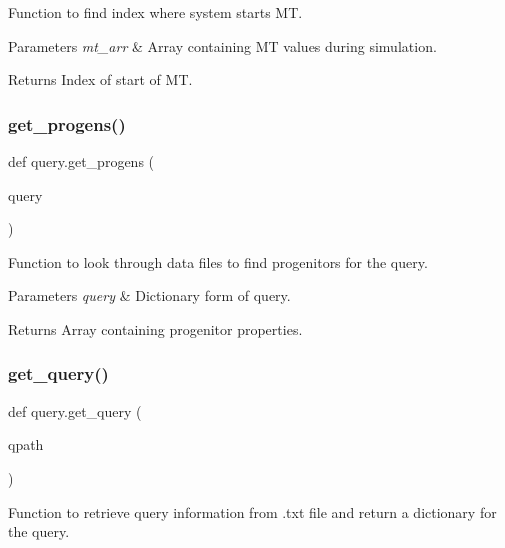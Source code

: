 Function to find index where system starts MT. 


\begin{DoxyParams}{Parameters}
{\em mt\+\_\+arr} & Array containing MT values during simulation. \\
\hline
\end{DoxyParams}
\begin{DoxyReturn}{Returns}
Index of start of MT. 
\end{DoxyReturn}
\mbox{\label{namespacequery_aa6657f1df72e61cb1a20d05df95d7dec}} 
\subsubsection{\texorpdfstring{get\+\_\+progens()}{get\_progens()}}
{\footnotesize\ttfamily def query.\+get\+\_\+progens (\begin{DoxyParamCaption}\item[{}]{query }\end{DoxyParamCaption})}



Function to look through data files to find progenitors for the query. 


\begin{DoxyParams}{Parameters}
{\em query} & Dictionary form of query. \\
\hline
\end{DoxyParams}
\begin{DoxyReturn}{Returns}
Array containing progenitor properties. 
\end{DoxyReturn}
\mbox{\label{namespacequery_a5c2d384360f955a8d047fe01db312f88}} 
\subsubsection{\texorpdfstring{get\+\_\+query()}{get\_query()}}
{\footnotesize\ttfamily def query.\+get\+\_\+query (\begin{DoxyParamCaption}\item[{}]{qpath }\end{DoxyParamCaption})}



Function to retrieve query information from .txt file and return a dictionary for the query. 


